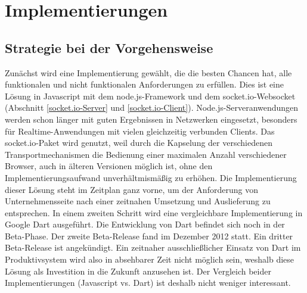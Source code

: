 
\chapter{Implementierungen}\label{s.Implementierungen}

\section{Strategie bei der Vorgehensweise}\label{Strategie bei der Vorgehensweise}
Zunächst wird eine Implementierung gewählt, die die besten Chancen hat, alle funktionalen und nicht funktionalen Anforderungen zu erfüllen. Dies ist eine Lösung in Javascript mit dem node.js-Framework und dem socket.io-Websocket (Abschnitt \ref{socket.io-Server} und \ref{socket.io-Client}). Node.js-Serveranwendungen werden schon länger mit guten Ergebnissen in Netzwerken eingesetzt, besonders für Realtime-Anwendungen mit vielen gleichzeitig verbunden Clients. Das socket.io-Paket wird genutzt, weil durch die Kapselung der verschiedenen Transportmechanismen die Bedienung einer maximalen Anzahl verschiedener Browser, auch in älteren Versionen möglich ist, ohne den Implementierungsaufwand unverhältmismäßig zu erhöhen. Die Implementierung dieser Lösung steht im Zeitplan ganz vorne, um der Anforderung von Unternehmensseite nach einer zeitnahen Umsetzung und Auslieferung zu entsprechen.
In einem zweiten Schritt wird eine vergleichbare Implementierung in Google Dart ausgeführt. Die Entwicklung von Dart befindet sich noch in der Beta-Phase. Der zweite Beta-Release fand im Dezember 2012 statt. Ein dritter Beta-Release ist angekündigt. Ein zeitnaher ausschließlicher Einsatz von Dart im Produktivsystem wird also in absehbarer Zeit nicht möglich sein, weshalb diese Lösung als Investition in die Zukunft anzusehen ist. 
Der Vergleich beider Implementierungen (Javascript vs. Dart) ist deshalb nicht weniger interessant.   
